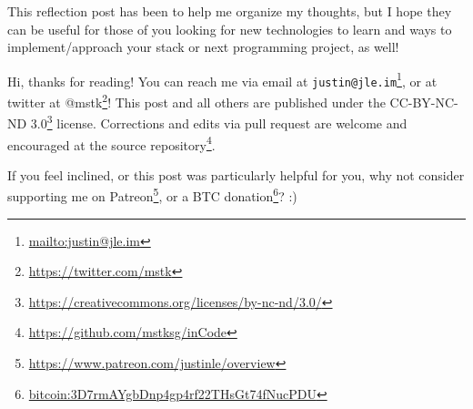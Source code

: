 \documentclass[]{article}
\renewcommand{\href}[2]{#2\footnote{\url{#1}}}
\begin{document}
This reflection post has been to help me organize my thoughts, but I hope they
can be useful for those of you looking for new technologies to learn and ways to
implement/approach your stack or next programming project, as well!

Hi, thanks for reading! You can reach me via email at
\href{mailto:justin@jle.im}{\nolinkurl{justin@jle.im}}, or at twitter at
\href{https://twitter.com/mstk}{@mstk}! This post and all others are published
under the \href{https://creativecommons.org/licenses/by-nc-nd/3.0/}{CC-BY-NC-ND
3.0} license. Corrections and edits via pull request are welcome and encouraged
at \href{https://github.com/mstksg/inCode}{the source repository}.

If you feel inclined, or this post was particularly helpful for you, why not
consider \href{https://www.patreon.com/justinle/overview}{supporting me on
Patreon}, or a \href{bitcoin:3D7rmAYgbDnp4gp4rf22THsGt74fNucPDU}{BTC donation}?
:)
\end{document}
